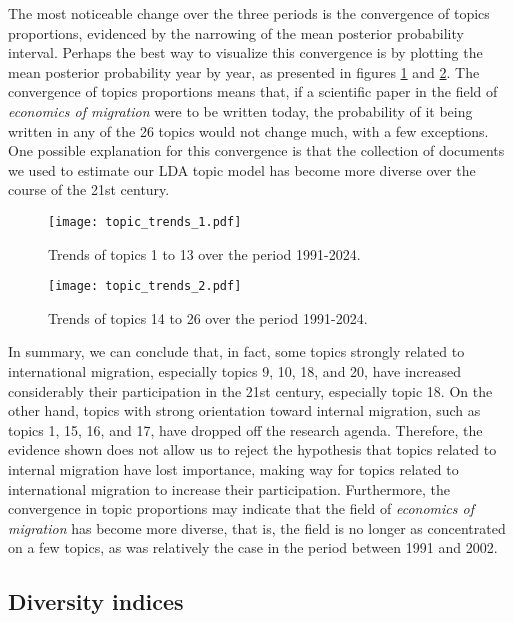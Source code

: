 The most noticeable change over the three periods is the convergence of topics proportions, evidenced by the narrowing of the mean posterior probability interval. Perhaps the best way to visualize this convergence is by plotting the mean posterior probability year by year, as presented in figures \ref{fig:topic_trends_1} and \ref{fig:topic_trends_2}. The convergence of topics proportions means that, if a scientific paper in the field of \textit{economics of migration} were to be written today, the probability of it being written in any of the 26 topics would not change much, with a few exceptions. One possible explanation for this convergence is that the collection of documents we used to estimate our LDA topic model has become more diverse over the course of the 21st century.

\begin{figure}[ht!]
	\centering
	\texttt{[image: topic\_trends\_1.pdf]}
	\caption{Trends of topics 1 to 13 over the period 1991-2024.}
	\label{fig:topic_trends_1}
\end{figure}

\begin{figure}[ht!]
	\centering
	\texttt{[image: topic\_trends\_2.pdf]}
	\caption{Trends of topics 14 to 26 over the period 1991-2024.}
	\label{fig:topic_trends_2}
\end{figure}

In summary, we can conclude that, in fact, some topics strongly related to international migration, especially topics 9, 10, 18, and 20, have increased considerably their participation in the 21st century, especially topic 18. On the other hand, topics with strong orientation toward internal migration, such as topics 1, 15, 16, and 17, have dropped off the research agenda. Therefore, the evidence shown does not allow us to reject the hypothesis that topics related to internal migration have lost importance, making way for topics related to international migration to increase their participation. Furthermore, the convergence in topic proportions may indicate that the field of \textit{economics of migration} has become more diverse, that is, the field is no longer as concentrated on a few topics, as was relatively the case in the period between 1991 and 2002.

\subsection{Diversity indices} \label{results_diversity_indices}

